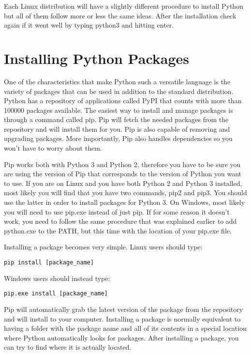 Each Linux distribution will have a slightly different procedure to install Python but all of them follow more or less the same ideas. After the installation check again if it went well by typing python3 and hitting enter.

\section{Installing Python Packages}
One of the characteristics that make Python such a versatile language is the variety of packages that can be used in addition to the standard distribution. Python has a repository of applications called PyPI that counts with more than 100000 packages available. The easiest way to install and manage packages is through a command called pip. Pip will fetch the needed packages from the repository and will install them for you. Pip is also capable of removing and upgrading packages. More importantly, Pip also handles dependencies so you won’t have to worry about them.

Pip works both with Python 3 and Python 2, therefore you have to be sure you are using the version of Pip that corresponds to the version of Python you want to use. If you are on Linux and you have both Python 2 and Python 3 installed, most likely you will find that you have two commands, pip2 and pip3. You should use the latter in order to install packages for Python 3. On Windows, most likely you will need to use pip.exe instead of just pip. If for some reason it doesn’t work, you need to follow the same procedure that was explained earlier to add python.exe to the PATH, but this time with the location of your pip.exe file.

Installing a package becomes very simple. Linux users should type:
\begin{verbatim}
pip install [package_name]
\end{verbatim}

Windows users should instead type:
\begin{verbatim}
pip.exe install [package_name]
\end{verbatim}

Pip will automatically grab the latest version of the package from the repository and will install to your computer. Installing a package is normally equivalent to having a folder with the package name and all of its contents in a special location where Python automatically looks for packages. After installing a package, you can try to find where it is actually located.

